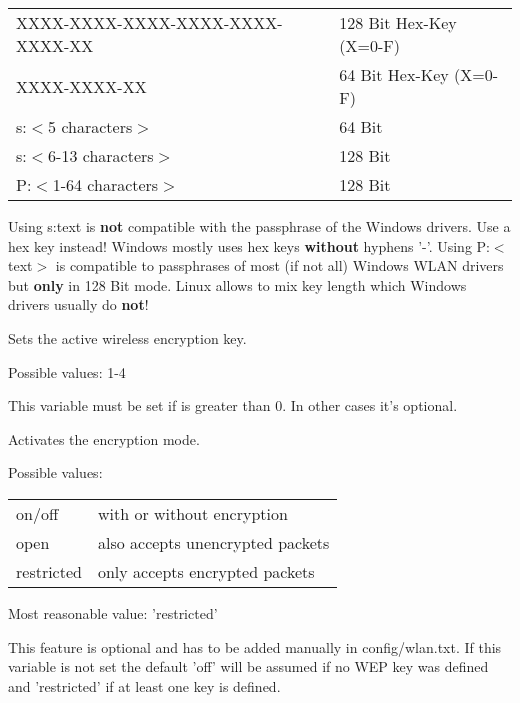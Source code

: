 \begin{description}
        \begin{tabular}[h]{ll}
        XXXX-XXXX-XXXX-XXXX-XXXX-XXXX-XX &       128 Bit Hex-Key (X=0-F) \\
        XXXX-XXXX-XX                     &        64 Bit Hex-Key (X=0-F) \\
        s:$<$5 characters$>$             &        64 Bit\\
        s:$<$6-13 characters$>$          &       128 Bit\\
        P:$<$1-64 characters$>$          &       128 Bit\\
        \end{tabular}

        Using s:text is \textbf{not} compatible with the passphrase of the Windows drivers. 
        Use a hex key instead!
        Windows mostly uses hex keys \textbf{without} hyphens '-'.
        Using P:$<$text$>$ is compatible to passphrases of most (if not all) Windows 
        WLAN drivers but \textbf{only} in 128 Bit mode.
        Linux allows to mix key length which Windows drivers usually do \textbf{not}!


        Sets the active wireless encryption key.

        Possible values: 1-4
        
        This variable must be set if  is greater than 0. In other 
        cases it's optional.


        Activates the encryption mode.

        Possible values:

        \begin{tabular}[h]{ll}
          on/off &         with or without encryption\\
          open   &         also accepts unencrypted packets\\
          restricted &     only accepts encrypted packets\\
        \end{tabular}

        Most reasonable value: 'restricted'
        
        This feature is optional and has to be added manually in config/wlan.txt.
        If this variable is not set the default 'off' will be assumed if no WEP key 
        was defined and 'restricted' if at least one key is defined.


\end{description}
